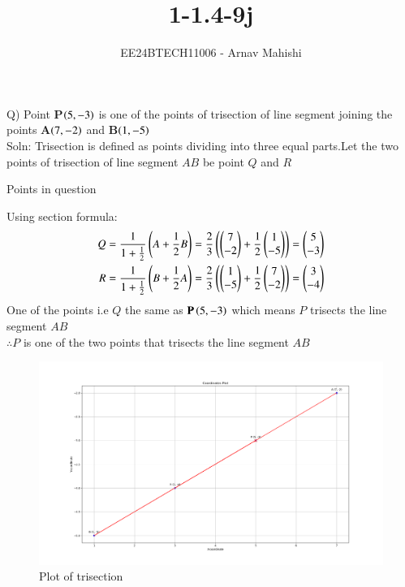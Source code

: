 \documentclass[journal]{IEEEtran}
\begin{document}

\vspace{3cm}

\title{1-1.4-9j}
\author{EE24BTECH11006 - Arnav Mahishi}
{\let\newpage\relax\maketitle}

\renewcommand{\thefigure}{\theenumi}
\renewcommand{\thetable}{\theenumi}
\setlength{\intextsep}{10pt} %


\renewcommand{\thetable}{\theenumi}

Q) Point \textbf{P}$\left(5,-3\right)$ is one of the points of trisection of line segment joining the points \textbf{A}$\left(7,-2\right)$ and \textbf{B}$\left(1,-5\right)$
\\Soln: Trisection is defined as points dividing into three equal parts.\space Let the two points of trisection of line segment $AB$ be point $Q$ and $R$\\
\begin{table}[h!]    
  \centering
  
  \caption{Points in question}
\end{table}
Using section formula:\\
\begin{align}
Q=\frac{1}{1+\frac{1}{2}}\left(A+\frac{1}{2}B\right)=
\frac{2}{3}\left(\begin{pmatrix}7\\-2\end{pmatrix}+\frac{1}{2}\begin{pmatrix}1\\-5\end{pmatrix}\right)=\begin{pmatrix}5\\-3\end{pmatrix}\\
R=\frac{1}{1+\frac{1}{2}}\left(B+\frac{1}{2}A\right)=
\frac{2}{3}\left(\begin{pmatrix}1\\-5\end{pmatrix}+\frac{1}{2}\begin{pmatrix}7\\-2\end{pmatrix}\right)=\begin{pmatrix}3\\-4\end{pmatrix}
\end{align}
One of the points i.e $Q$ the same as $\textbf{P}\left(5,-3\right)$ which means $P$ trisects the line segment $AB$\\
$\therefore P$ is one of the two points that trisects the line segment $AB$
\begin{figure}[h!]
   \centering
   \includegraphics[width=0.7\linewidth]{figs/Figure_1.png}
   \caption{Plot of trisection}
   \label{stemplot}
\end{figure}
\end{document}
